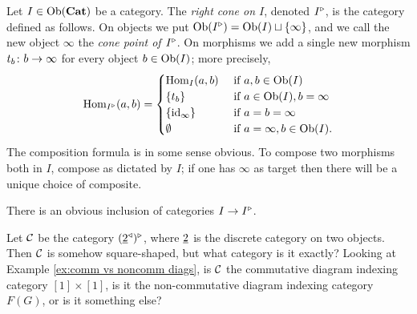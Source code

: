 \documentclass[CT4S-EN-RU]{subfiles}
\begin{document}
\begin{definitionENG}\label{def:rcone}
Let $I\in\textnormal{Ob}({\bf Cat})$ be a category. The {\em right cone on $I$}, denoted $I^\triangleright$, is the category defined as follows. On objects we put $\textnormal{Ob}(I^\triangleright)=\textnormal{Ob}(I)\sqcup\{\infty\}$, and we call the new object $\infty$ the {\em cone point of $I^\triangleright$}. On morphisms we add a single new morphism $t_b\colon b\rightarrow\infty$ for every object $b\in \textnormal{Ob}(I)$; more precisely,
$$\textnormal{Hom}_{I^\triangleright}(a,b)=
\begin{cases}
\textnormal{Hom}_I(a,b)&\textnormal{ if }a,b\in\textnormal{Ob}(I)\\
\{t_b\}&\textnormal{ if }a\in\textnormal{Ob}(I), b=\infty\\
\{\textnormal{id}_{\infty}\}&\textnormal{ if } a=b=\infty\\
\emptyset&\textnormal{ if } a=\infty,b\in\textnormal{Ob}(I).
\end{cases}$$
The composition formula is in some sense obvious. To compose two morphisms both in $I$, compose as dictated by $I$; if one has $\infty$ as target then there will be a unique choice of composite.

There is an obvious inclusion of categories $I\rightarrow I^\triangleright$.
\end{definitionENG}

\begin{definitionRUS}\label{def:rcone}
\end{definitionRUS}

\begin{exerciseENG}
Let $\mathcal{C}$ be the category $(\underline{2}^\triangleleft)^\triangleright$, where $\underline{2}$ is the discrete category on two objects. Then $\mathcal{C}$ is somehow square-shaped, but what category is it exactly? Looking at Example \ref{ex:comm vs noncomm diags}, is $\mathcal{C}$ the commutative diagram indexing category $[1]\times[1]$, is it the non-commutative diagram indexing category $F(G)$, or is it something else?
\end{exerciseENG}

\begin{exerciseRUS}
\end{exerciseRUS}


\subsection{}\label{sec:lims and colims in a cat}
\end{document}
